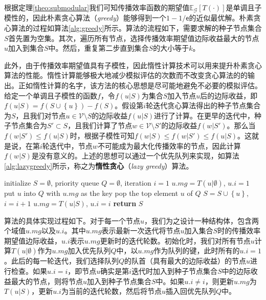 根据定理\ref{theo:submodular}我们可知传播效率函数的期望值$\mathbb{E}_\mathcal{G}\left[T\left(\cdot\right)\right]$是单调且子模性的，因此朴素贪心算法（\textit{greedy}）能够得到一个$1-1/\mathsf{e}$的近似最优解。朴素贪心算法的过程如算法\ref{alg:greedy}所示。算法的流程如下，需要求解的种子节点集合$S$首先置为空集。其次，遍历所有节点，选择传播效率期望值边际收益最大的节点$u$加入到集合$S$中。然后，重复第二步直到集合$S$的大小等于$k$。

此外，由于传播效率期望值具有子模性，因此惰性计算技术可以用来提升朴素贪心算法的性能。惰性计算能够极大地减少模拟评估的次数而不改变贪心算法的的输出。正如惰性计算的名字，该方法的核心思想是尽可能地避免不必要的模拟评估。给定一个单调且子模性的函数$f$，令$f\left(u|S\right)$为集合$S$加入节点$u$后的边际收益，即$f\left(u|S\right) = f\left( S \cup \left\{u\right\} \right) - f\left( S \right)$。假设第$i$轮迭代贪心算法得出的种子节点集合为$S$，且我们对节点$u \in \mathcal{V} \setminus S$的边际收益$f\left(u|S\right)$进行了计算。在更早的迭代中，种子节点集合为$S' \subset S$，且我们计算了节点$w \in \mathcal{V} \setminus S'$的边际收益$f\left(w|S'\right)$。那么当$f\left(w|S'\right) \leq f\left(u|S\right)$时，根据子模性可知$f\left(w|S\right) \leq f\left(w|S'\right) \leq f\left(u|S\right)$。这就是说，在第$i$轮迭代中，节点$w$不可能成为最大化传播效率的节点，因此计算$f\left(w|S\right)$是没有意义的。上述的思想可以通过一个优先队列来实现，如算法\ref{alg:lazygreedy}所示，称之为\textbf{惰性贪心}（\textit{lazy greedy}）算法。

\begin{algorithm}[!ht]
    \caption{$LazyGreedy(k,T)$}
    \label{alg:lazygreedy}
    \begin{algorithmic}[1]
    \STATE initialize $S=\emptyset$, priority queue $Q=\emptyset$, iteration $i=1$
        \STATE $u.mg=T\left(u|\emptyset\right)$, $u.i=1$
        \STATE put $u$ into $Q$ with $u.mg$ as the key
    \ENDFOR
        \STATE pop the top element $u$ of $Q$
            \STATE $S = S \cup \left\{u\right\}$, $i=i+1$
        \ELSE
            \STATE $u.mg=T\left(u|S\right)$,  $u.i=i$ 
        \ENDIF
    \ENDWHILE
    \STATE \textbf{return} $S$
    \end{algorithmic}
\end{algorithm}

算法的具体实现过程如下。对于每一个节点$u$，我们为之设计一种结构体，包含两个域值$u.mg$以及$u.i$。其中$u.mg$表示最新一次迭代将节点$u$加入集合$S$时的传播效率期望值边际收益，$u.i$表示$u.mg$更新时的迭代轮数。初始化时，我们对所有节点$u$计算$T\left(u|\emptyset\right)$作为$u.mg$加入优先队列$Q$中，以$u.mg$作为队列的键，此时所有的$u.i=1$。此后的每一轮迭代，我们选择队列$Q$的队首（具有最大的边际收益）的节点$u$进行检查。如果$u.i=i$，即节点$u$确实是第$i$迭代时加入到种子节点集合$S$中的边际收益最大的节点，则将节点$u$加入到种子节点集合$S$中。如果$u.i \neq i$，则更新$u.mg$为$T\left(u|S\right)$，更新$u.i$为当前的迭代轮数，然后将节点$u$插入回优先队列$Q$中。

